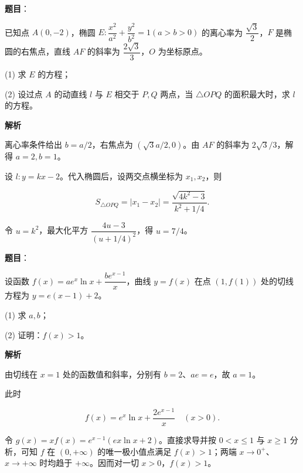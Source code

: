 \begin{answer}

\textbf{题目}：

已知点 $A(0,-2)$，椭圆 $E:\dfrac{x^2}{a^2}+\dfrac{y^2}{b^2}=1 (a>b>0)$ 的离心率为 $\dfrac{\sqrt3}{2}$，$F$ 是椭圆的右焦点，直线 $AF$ 的斜率为 $\dfrac{2\sqrt3}{3}$，$O$ 为坐标原点。

(1) 求 $E$ 的方程；

(2) 设过点 $A$ 的动直线 $l$ 与 $E$ 相交于 $P,Q$ 两点，当 $\triangle OPQ$ 的面积最大时，求 $l$ 的方程。

\textbf{解析}


离心率条件给出 $b=a/2$，右焦点为 $(\sqrt3a/2,0)$。由 $AF$ 的斜率为 $2\sqrt3/3$，解得 $a=2,b=1$。


设 $l:y=kx-2$。代入椭圆后，设两交点横坐标为 $x_1,x_2$，则

\nopagebreak[4]
\[
S_{\triangle OPQ}=|x_1-x_2|=\frac{\sqrt{4k^2-3}}{k^2+1/4}.
\]

令 $u=k^2$，最大化平方 $\dfrac{4u-3}{(u+1/4)^2}$，得 $u=7/4$。



\end{answer}
\begin{answer}

\textbf{题目}：

设函数 $f(x)=ae^x\ln x+\dfrac{be^{x-1}}x$，曲线 $y=f(x)$ 在点 $(1,f(1))$ 处的切线方程为 $y=e(x-1)+2$。

(1) 求 $a,b$；

(2) 证明：$f(x)>1$。

\textbf{解析}


由切线在 $x=1$ 处的函数值和斜率，分别有 $b=2$、$ae=e$，故 $a=1$。


此时

\nopagebreak[4]
\[
f(x)=e^x\ln x+\frac{2e^{x-1}}x\quad(x>0).
\]

令 $g(x)=xf(x)=e^{x-1}(ex\ln x+2)$。直接求导并按 $0<x\leqslant1$ 与 $x\geqslant1$ 分析，可知 $f$ 在 $(0,+\infty)$ 的唯一极小值点满足 $f(x)>1$；两端 $x\to0^+$、$x\to+\infty$ 时均趋于 $+\infty$。因而对一切 $x>0$，$f(x)>1$。



\end{answer}
